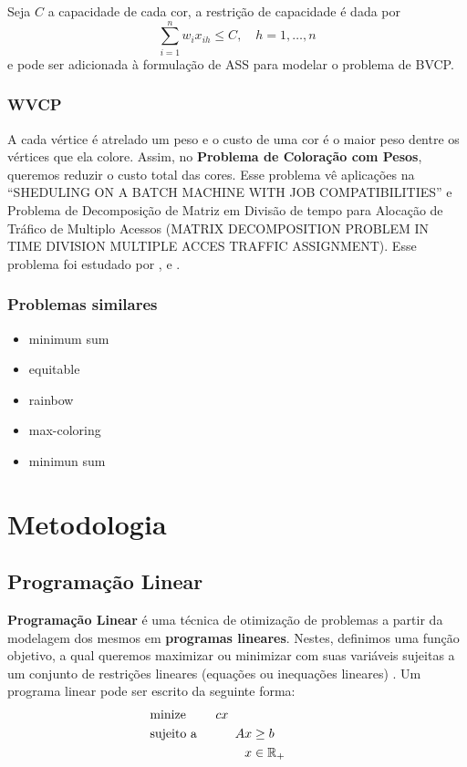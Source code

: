 \documentclass[11pt]{article}
\begin{document}
Seja \(C\) a capacidade de cada cor, a restrição de capacidade é dada por
\[ \sum_{i=1}^n w_i x_{ih} \leq C, \quad h = 1, \dots, n\]
e pode ser adicionada à formulação de ASS para modelar o problema de BVCP.
\subsubsection{WVCP}
\label{sec:orgd187136}
A cada vértice é atrelado um peso e o custo de uma cor é o maior peso dentre os vértices que ela colore.
Assim, no \textbf{Problema de Coloração com Pesos}, queremos reduzir o custo total das cores.
Esse problema vê aplicações na ``SHEDULING ON A BATCH MACHINE WITH JOB COMPATIBILITIES'' e Problema de Decomposição de Matriz em Divisão de tempo para Alocação de Tráfico de Multiplo Acessos (MATRIX DECOMPOSITION PROBLEM IN TIME DIVISION MULTIPLE ACCES TRAFFIC ASSIGNMENT).
Esse problema foi estudado por \autocite{Werra1985introductiontimetabling}, \autocite{Escoffier2006WeightedColoringfurther} e \autocite{Finke2008Batchprocessinginterval}.
\subsubsection{Problemas similares}
\label{sec:org47f6515}
\begin{itemize}
\item minimum sum
\item equitable
\item rainbow
\item max-coloring
\item minimun sum
\end{itemize}
\section{Metodologia}
\label{sec:org22a1fa7}
\subsection{Programação Linear}
\label{sec:orgd974e60}
\textbf{Programação Linear} é uma técnica de otimização de problemas a partir da modelagem dos mesmos em \textbf{programas lineares}.
Nestes, definimos uma função objetivo, a qual queremos maximizar ou minimizar com suas variáveis sujeitas a um conjunto de restrições lineares (equações ou inequações lineares) \autocite{Chvatal1983LinearProgramming} . Um programa linear pode ser escrito da seguinte forma:
\begin{alignat*}{4}
& \omit\rlap{minize \quad \quad $\displaystyle cx$} \\
& \mbox{sujeito a}&& \quad & Ax & \geq b  & \quad &  \\
&                 &&       & x               & \in \mathbb{R}_+ &      &
\end{alignat*}
\end{document}
